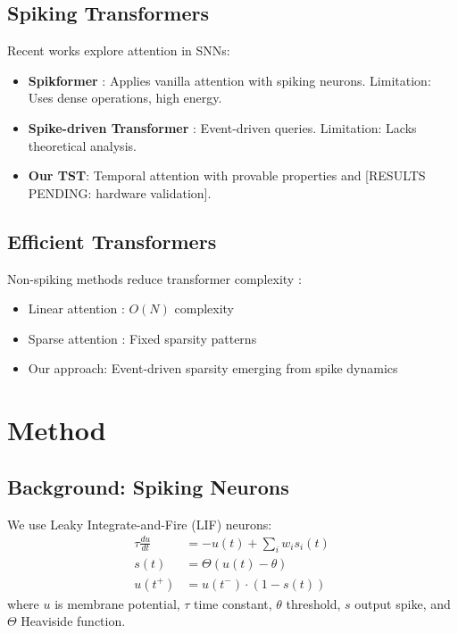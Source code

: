 \documentclass{article}
\begin{document}
\subsection{Spiking Transformers}
Recent works explore attention in SNNs:
\begin{itemize}
    \item \textbf{Spikformer} \cite{zhou2023spikformer}: Applies vanilla attention with spiking neurons. Limitation: Uses dense operations, high energy.
    \item \textbf{Spike-driven Transformer} \cite{yao2023spike}: Event-driven queries. Limitation: Lacks theoretical analysis.
    \item \textbf{Our TST}: Temporal attention with provable properties and [RESULTS PENDING: hardware validation].
\end{itemize}

\subsection{Efficient Transformers}
Non-spiking methods reduce transformer complexity \cite{tay2020efficient}:
\begin{itemize}
    \item Linear attention \cite{katharopoulos2020transformers}: $O(N)$ complexity
    \item Sparse attention \cite{child2019sparse}: Fixed sparsity patterns
    \item Our approach: Event-driven sparsity emerging from spike dynamics
\end{itemize}

\section{Method}

\subsection{Background: Spiking Neurons}

We use Leaky Integrate-and-Fire (LIF) neurons:
\begin{align}
    \tau \frac{du}{dt} &= -u(t) + \sum_i w_i s_i(t) \label{eq:lif} \\
    s(t) &= \Theta(u(t) - \theta) \label{eq:spike} \\
    u(t^+) &= u(t^-) \cdot (1 - s(t)) \label{eq:reset}
\end{align}
where $u$ is membrane potential, $\tau$ time constant, $\theta$ threshold, $s$ output spike, and $\Theta$ Heaviside function.
\end{document}
